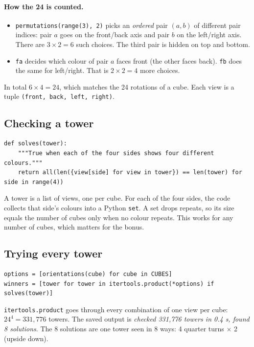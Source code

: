 \documentclass[11pt]{article}
\newcommand{\code}[1]{\texttt{#1}}
\begin{document}
\paragraph{How the 24 is counted.}
\begin{itemize}
  \item \code{permutations(range(3), 2)} picks an \emph{ordered} pair
        $(a, b)$ of different pair indices: pair $a$ goes on the front/back
        axis and pair $b$ on the left/right axis. There are $3 \times 2 = 6$
        such choices. The third pair is hidden on top and bottom.
  \item \code{fa} decides which colour of pair $a$ faces front (the other faces
        back). \code{fb} does the same for left/right. That is $2 \times 2 = 4$
        more choices.
\end{itemize}
In total $6 \times 4 = 24$, which matches the 24 rotations of a cube. Each view
is a tuple \code{(front, back, left, right)}.

\subsection{Checking a tower}

\begin{lstlisting}
def solves(tower):
    """True when each of the four sides shows four different colours."""
    return all(len({view[side] for view in tower}) == len(tower) for side in range(4))
\end{lstlisting}

A tower is a list of views, one per cube. For each of the four sides, the code
collects that side's colours into a Python \code{set}. A set drops repeats, so
its size equals the number of cubes only when no colour repeats. This works for
any number of cubes, which matters for the bonus.

\subsection{Trying every tower}

\begin{lstlisting}
options = [orientations(cube) for cube in CUBES]
winners = [tower for tower in itertools.product(*options) if solves(tower)]
\end{lstlisting}

\code{itertools.product} goes through every combination of one view per cube:
$24^4 = 331{,}776$ towers. The saved output is
\emph{checked 331,776 towers in 0.4 s, found 8 solutions}. The 8 solutions are
one tower seen in 8 ways: 4 quarter turns $\times$ 2 (upside down).
\end{document}
